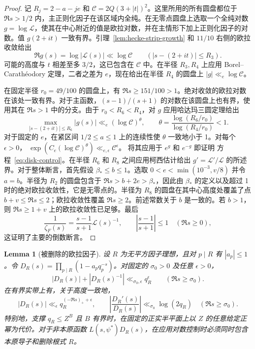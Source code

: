 \documentclass[11pt,a4paper]{article}
\numberwithin{equation}{section}
\numberwithin{figure}{section}
\newtheorem{lemma}[theorem]{Lemma}
\theoremstyle{definition}
\theoremstyle{remark}
\begin{document}
\begin{proof}
记 $R_j=2-a-je$ 和 $\mathcal C=2Q(3+|t|)^2$。这里所用的所有圆盘都位于 $\Re s>1/2$ 内，主正则化因子在该区域内全纯。在无零点圆盘上选取一个全纯对数 $g=\log\mathcal L$，使其在中心附近的值是欧拉对数，并在主情形下加上正则化因子的对数。值 $g(2+it)$ 一致有界。引理~\ref{lem:hecke-strip-growth} 和 $11/10$ 右侧的欧拉收敛给出
\[
 \Re g(s)=\log|\mathcal L(s)|\ll\log\mathcal C
       \qquad(|s-(2+it)|\le R_3).
\]
可能的高度与 $t$ 相差至多 $3/2$，这已包含在 $\mathcal C$ 中。在半径 $R_3,R_4$ 上应用 Borel--Carath\'eodory 定理，二者之差为 $e$，现在给出在半径 $R_4$ 的圆盘上 $|g|\ll_e\log\mathcal C$。

在固定半径 $r_0=49/100$ 的圆盘上，有 $\Re s\ge151/100>1$。绝对收敛的欧拉对数在该处一致有界。对于主函数，$(s-1)/(s+1)$ 的对数在该圆盘上也有界，使用其在 $\Re s>1$ 中的分支。由于
$r_0<R_6<R_4$，对 $g$ 应用哈达玛三圆定理给出
\[
 \max_{|s-(2+it)|\le R_6}|g(s)|
 \ll_e(\log\mathcal C)^\theta,
 \qquad
 \theta=\frac{\log(R_6/r_0)}{\log(R_4/r_0)}<1.
\]
对于固定的 $e$，在紧区间 $1/2\le a\le1$ 上的连续性使 $\theta$ 一致地小于 1。对每个 $\epsilon>0$，
$\exp(C_e(\log\mathcal C)^\theta)\ll_{e,\epsilon}\mathcal C^\epsilon$。
将其应用于 $e^g$ 和 $e^{-g}$ 即证明
方程~\eqref{eq:disk-control}。在半径 $R_6$ 和 $R_8$ 之间应用柯西估计给出 $g'=\mathcal L'/\mathcal L$ 的所述界。对于整体断言，首先假设 $\beta_*\le b\le1$。选取
$0<e<\min(10^{-3},v/8)$ 并令 $a=b$。半径为 $R_2$ 的圆盘包含于
$\Re s>b+2e>\beta_*$，因此由 $\beta_*$ 的定义以及超过 1 时的绝对欧拉收敛性，它是无零点的。半径为 $R_8$ 的圆盘在其中心高度处覆盖了点 $b+v\le\Re s\le2$；欧拉收敛性覆盖 $\Re s\ge2$。前述常数关于 $b$ 是一致的。若 $b>1$，则 $\Re s\ge1+v$ 上的欧拉收敛性已足够。最后
\[
 \frac1{\zeta_F(s)}=\frac{s-1}{s+1}\mathcal L(s)^{-1},
 \qquad \left|\frac{s-1}{s+1}\right|\le1\quad(\Re s\ge0),
\]
这证明了主要的倒数断言。
\end{proof}

\begin{lemma}[被删除的欧拉因子]\label{lem:deleted-euler-factors}
设 $R$ 为无平方因子理想，且对 $p\mid R$ 有 $|a_p|\le1$。令
$D_R(s)=\prod_{p\mid R}(1-a_pq_p^{-s})$。对固定的 $\sigma_0>0$ 及任意
$\epsilon>0$，
\[
 |D_R(s)|+|D_R(s)^{-1}|\ll_{\sigma_0,\epsilon}q_R^\epsilon
       \qquad(\Re s\ge\sigma_0).
\]
在有界实带上有，关于高度一致地，
\[
 |D_R(s)|\ll_\epsilon q_R^{(-\Re s)_++\epsilon},
 \qquad
 \left|\frac{D_R'(s)}{D_R(s)}\right|
 \ll_{\sigma_0}\log(2q_R)\quad(\Re s\ge\sigma_0).
\]
特别地，支撑 $q_R\le Z^B$ 且 $B$ 有界时，在固定的正实半平面上以 $Z$ 的任意给定正幂为代价。对于非本原函数 $L(s,\psi^*)D_R(s)$，在应用对数控制时必须同时包含本原导子和删除根式 $R$。
\end{lemma}
\end{document}
